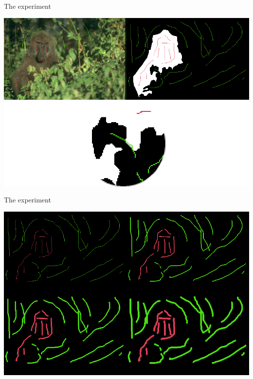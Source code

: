 \documentclass[14pt,xcolor=dvipsnames]{beamer}
\begin{document}
\begin{frame}[fragile,t]{The experiment}
	\begin{center}
		\includegraphics[width=\paperheight]{dilation_error_example}
	\end{center}
\end{frame}

\begin{frame}[fragile,t]{The experiment}
	\begin{center}
		\includegraphics[width=\paperheight]{dilate_example_all}
	\end{center}
\end{frame}
\end{document}
